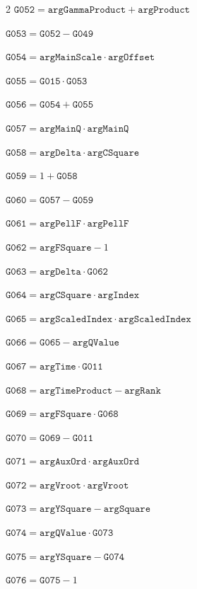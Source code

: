 \documentclass[10pt]{article}
\begin{document}
\begin{multicols}{2}
\noindent $\mathtt{G052}=\mathtt{argGammaProduct}+\mathtt{argProduct}$\par
\noindent $\mathtt{G053}=\mathtt{G052}-\mathtt{G049}$\par
\noindent $\mathtt{G054}=\mathtt{argMainScale}\cdot \mathtt{argOffset}$\par
\noindent $\mathtt{G055}=\mathtt{G015}\cdot \mathtt{G053}$\par
\noindent $\mathtt{G056}=\mathtt{G054}+\mathtt{G055}$\par
\noindent $\mathtt{G057}=\mathtt{argMainQ}\cdot \mathtt{argMainQ}$\par
\noindent $\mathtt{G058}=\mathtt{argDelta}\cdot \mathtt{argCSquare}$\par
\noindent $\mathtt{G059}=1+\mathtt{G058}$\par
\noindent $\mathtt{G060}=\mathtt{G057}-\mathtt{G059}$\par
\noindent $\mathtt{G061}=\mathtt{argPellF}\cdot \mathtt{argPellF}$\par
\noindent $\mathtt{G062}=\mathtt{argFSquare}-1$\par
\noindent $\mathtt{G063}=\mathtt{argDelta}\cdot \mathtt{G062}$\par
\noindent $\mathtt{G064}=\mathtt{argCSquare}\cdot \mathtt{argIndex}$\par
\noindent $\mathtt{G065}=\mathtt{argScaledIndex}\cdot \mathtt{argScaledIndex}$\par
\noindent $\mathtt{G066}=\mathtt{G065}-\mathtt{argQValue}$\par
\noindent $\mathtt{G067}=\mathtt{argTime}\cdot \mathtt{G011}$\par
\noindent $\mathtt{G068}=\mathtt{argTimeProduct}-\mathtt{argRank}$\par
\noindent $\mathtt{G069}=\mathtt{argFSquare}\cdot \mathtt{G068}$\par
\noindent $\mathtt{G070}=\mathtt{G069}-\mathtt{G011}$\par
\noindent $\mathtt{G071}=\mathtt{argAuxOrd}\cdot \mathtt{argAuxOrd}$\par
\noindent $\mathtt{G072}=\mathtt{argVroot}\cdot \mathtt{argVroot}$\par
\noindent $\mathtt{G073}=\mathtt{argYSquare}-\mathtt{argSquare}$\par
\noindent $\mathtt{G074}=\mathtt{argQValue}\cdot \mathtt{G073}$\par
\noindent $\mathtt{G075}=\mathtt{argYSquare}-\mathtt{G074}$\par
\noindent $\mathtt{G076}=\mathtt{G075}-1$\par

\end{multicols}
\end{document}
